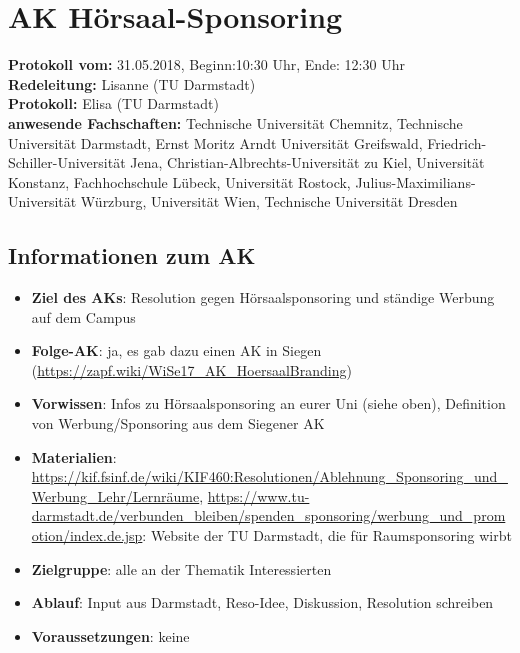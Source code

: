 
\section{AK Hörsaal-Sponsoring}

	\textbf{Protokoll vom:} 31.05.2018,
	Beginn:10:30 Uhr,
	Ende: 12:30 Uhr \\
	\textbf{Redeleitung:} Lisanne (TU Darmstadt) \\
	\textbf{Protokoll:} Elisa (TU Darmstadt) \\
	\textbf{anwesende Fachschaften:} Technische Universität Chemnitz, Technische Universität Darmstadt, Ernst Moritz Arndt Universität Greifswald, Friedrich-Schiller-Universität Jena, Christian-Albrechts-Universität zu Kiel, Universität Konstanz, Fachhochschule Lübeck, Universität Rostock, Julius-Maximilians-Universität Würzburg, Universität Wien, Technische Universität Dresden

	\subsection*{Informationen zum AK}
		\begin{itemize}
			\item \textbf{Ziel des AKs}: Resolution gegen Hörsaalsponsoring und ständige Werbung auf dem Campus
			\item \textbf{Folge-AK}:  ja, es gab dazu einen AK in Siegen (\url{https://zapf.wiki/WiSe17_AK_HoersaalBranding})
			\item \textbf{Vorwissen}: Infos zu Hörsaalsponsoring an eurer Uni (siehe oben), Definition von Werbung/Sponsoring aus dem Siegener AK
      \item \textbf{Materialien}: \url{https://kif.fsinf.de/wiki/KIF460:Resolutionen/Ablehnung_Sponsoring_und_Werbung_Lehr/Lernräume}, \url{https://www.tu-darmstadt.de/verbunden_bleiben/spenden_sponsoring/werbung_und_promotion/index.de.jsp}: Website der TU Darmstadt, die für Raumsponsoring wirbt
			\item \textbf{Zielgruppe}: alle an der Thematik Interessierten
			\item \textbf{Ablauf}: Input aus Darmstadt, Reso-Idee, Diskussion, Resolution schreiben
			\item \textbf{Voraussetzungen}: keine
		\end{itemize}


